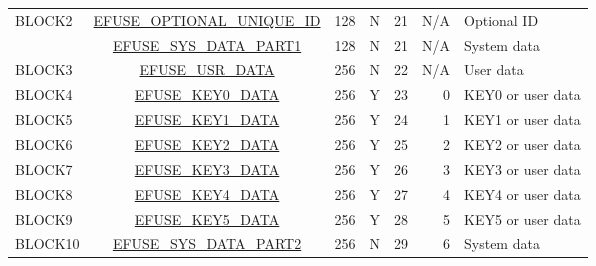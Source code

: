 \begin{longtable}[c]{ |l|c|c|c|r|r|l| }
    BLOCK2 & \hyperref[fielddesc:EFUSEOPTIONALUNIQUEID]{EFUSE\_OPTIONAL\_UNIQUE\_ID} & 128 & N & 21 & N/A & Optional ID \\\cline{2-7}
    & \hyperref[fielddesc:EFUSESYSDATAPART10]{EFUSE\_SYS\_DATA\_PART1} & 128 & N & 21 & N/A & System data \\\hline
    BLOCK3 & \hyperref[fielddesc:EFUSEUSRDATA0]{EFUSE\_USR\_DATA} & 256 & N & 22 & N/A & User data \\\hline
    BLOCK4 & \hyperref[fielddesc:EFUSEKEY0DATA0]{EFUSE\_KEY0\_DATA} & 256 & Y & 23 & 0 & KEY0 or user data \\
    \hline
    BLOCK5 & \hyperref[fielddesc:EFUSEKEY1DATA0]{EFUSE\_KEY1\_DATA} & 256 & Y & 24 & 1 & KEY1 or user data \\
    \hline
    BLOCK6 & \hyperref[fielddesc:EFUSEKEY2DATA0]{EFUSE\_KEY2\_DATA} & 256 & Y & 25 & 2 & KEY2 or user data \\
    \hline
    BLOCK7 & \hyperref[fielddesc:EFUSEKEY3DATA0]{EFUSE\_KEY3\_DATA} & 256 & Y & 26 & 3 & KEY3 or user data \\
    \hline
    BLOCK8 & \hyperref[fielddesc:EFUSEKEY4DATA0]{EFUSE\_KEY4\_DATA} & 256 & Y & 27 & 4 & KEY4 or user data \\
    \hline
    BLOCK9 & \hyperref[fielddesc:EFUSEKEY5DATA0]{EFUSE\_KEY5\_DATA} & 256 & Y & 28 & 5 & KEY5 or user data \\
    \hline
    BLOCK10 & \hyperref[fielddesc:EFUSESYSDATAPART20]{EFUSE\_SYS\_DATA\_PART2} & 256 & N & 29 & 6 & System data \\
    \hline
\end{longtable}
